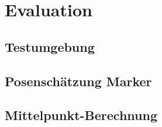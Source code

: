 \section{Evaluation}

\subsection{Testumgebung}

\subsection{Posenschätzung Marker}

\subsection{Mittelpunkt-Berechnung}


